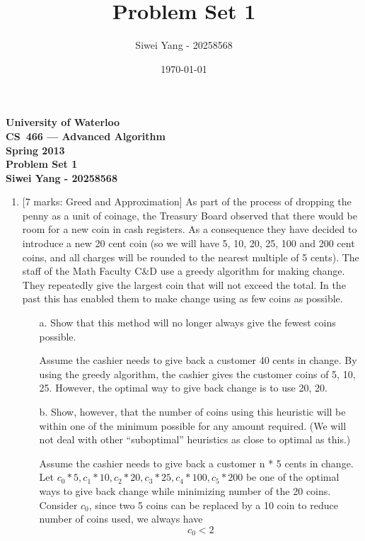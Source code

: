 \documentclass[12pt]{article}
\begin{document}
\begin{center}
\large\bf University of Waterloo\\
CS~466 --- Advanced Algorithm\\
Spring 2013\\
Problem Set 1\\
Siwei Yang - 20258568\\
\end{center}
\bigskip

\title{Problem Set 1}
\date{\today}
\author{Siwei Yang - 20258568}

\begin{enumerate}

\item{} [7 marks: Greed and Approximation]
As part of the process of dropping the penny as a unit of coinage, the Treasury Board observed that there would be room for a new coin in cash registers. As a consequence they have decided to introduce a new 20 cent coin (so we will have 5, 10, 20, 25, 100 and 200 cent coins, and all charges will be rounded to the nearest multiple of 5 cents). The staff of the Math Faculty C\&D use a greedy algorithm for making change. They repeatedly give the largest coin that will not exceed the total. In the past this has enabled them to make change using as few coins as possible.

\begin{itemize}

\item[a.] Show that this method will no longer always give the fewest coins possible.

Assume the cashier needs to give back a customer 40 cents in change. By using the greedy algorithm, the cashier gives the customer coins of 5, 10, 25. However, the optimal way to give back change is to use 20, 20.

\item[b.] Show, however, that the number of coins using this heuristic will be within one of the minimum possible for any amount required. (We will not deal with other “suboptimal” heuristics as close to optimal as this.)

Assume the cashier needs to give back a customer n * 5 cents in change.
Let
$c_{0} * 5, c_{1} * 10, c_{2} * 20, c_{3} * 25, c_{4} * 100, c_{5} * 200$
be one of the optimal ways to give back change while minimizing number of the 20 coins.
Consider $c_{0}$, since two 5 coins can be replaced by a 10 coin to reduce number of coins used, we always have
\begin{equation}
c_{0} < 2
\end{equation}


\end{itemize}
\end{enumerate}
\end{document}
